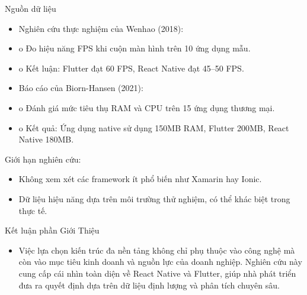     \begin{flushleft}
        \hspace*{0.8cm}Nguồn dữ liệu
        \setlength{\leftmargini}{1.5cm}
        \begin{itemize}
            \item Nghiên cứu thực nghiệm của Wenhao (2018):
            \item[] o	Đo hiệu năng FPS khi cuộn màn hình trên 10 ứng dụng mẫu.
            \item[] o	Kết luận: Flutter đạt 60 FPS, React Native đạt 45–50 FPS.
            \item Báo cáo của Biorn-Hansen (2021):
            \item[] o	Đánh giá mức tiêu thụ RAM và CPU trên 15 ứng dụng thương mại.
            \item[] o	Kết quả: Ứng dụng native sử dụng 150MB RAM, Flutter 200MB, React Native 180MB.
        \end{itemize}
      \end{flushleft}

      \begin{flushleft}
        \hspace*{0.8cm}Giới hạn nghiên cứu:
        \setlength{\leftmargini}{1.5cm}
        \begin{itemize}
            \item Không xem xét các framework ít phổ biến như Xamarin hay Ionic.
            \item Dữ liệu hiệu năng dựa trên môi trường thử nghiệm, có thể khác biệt trong thực tế.
        \end{itemize}
      \end{flushleft}

      \begin{flushleft}
        \hspace*{0.8cm}Kết luận phần Giới Thiệu
        \setlength{\leftmargini}{1.5cm}
        \begin{itemize}
            \item Việc lựa chọn kiến trúc đa nền tảng không chỉ phụ thuộc vào công nghệ mà còn vào mục tiêu kinh doanh và nguồn lực của doanh nghiệp. Nghiên cứu này cung cấp cái nhìn toàn diện về React Native và Flutter, giúp nhà phát triển đưa ra quyết định dựa trên dữ liệu định lượng và phân tích chuyên sâu.
        \end{itemize}
      \end{flushleft}

